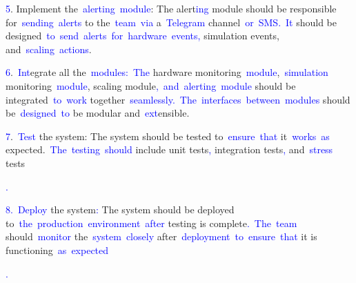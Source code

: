 \documentclass{article}
\begin{document}
\begin{tcolorbox}[colframe=black,colback=white]
\textcolor{blue}{5}. Implement the\textcolor{blue}{~alert}\textcolor{blue}{ing}\textcolor{blue}{~module}: The alert\textcolor{blue}{ing} module should be responsible for\textcolor{blue}{~sending}\textcolor{blue}{~alerts} to the\textcolor{blue}{~team}\textcolor{blue}{~via} a\textcolor{blue}{~Telegram} channel\textcolor{blue}{~or}\textcolor{blue}{~SMS}\textcolor{blue}{.}\textcolor{blue}{~It} should be designed\textcolor{blue}{~to}\textcolor{blue}{~send}\textcolor{blue}{~alerts}\textcolor{blue}{~for}\textcolor{blue}{~hardware}\textcolor{blue}{~events}\textcolor{blue}{,} simulation events, and\textcolor{blue}{~scaling}\textcolor{blue}{~actions}.

\textcolor{blue}{6}.\textcolor{blue}{~Int}egrate all the\textcolor{blue}{~modules}\textcolor{blue}{:}\textcolor{blue}{~The} hardware monitoring\textcolor{blue}{~module},\textcolor{blue}{~simulation} monitoring\textcolor{blue}{~module}, scaling module\textcolor{blue}{,}\textcolor{blue}{~and}\textcolor{blue}{~alert}\textcolor{blue}{ing}\textcolor{blue}{~module} should be integrated\textcolor{blue}{~to}\textcolor{blue}{~work} together\textcolor{blue}{~seamlessly}\textcolor{blue}{.}\textcolor{blue}{~The}\textcolor{blue}{~interfaces}\textcolor{blue}{~between}\textcolor{blue}{~modules} should be\textcolor{blue}{~designed}\textcolor{blue}{~to} be modular and\textcolor{blue}{~ext}ensible.

\textcolor{blue}{7}.\textcolor{blue}{~Test} the system: The system should be tested to\textcolor{blue}{~ensure}\textcolor{blue}{~that} it\textcolor{blue}{~works}\textcolor{blue}{~as} expected.\textcolor{blue}{~The}\textcolor{blue}{~testing}\textcolor{blue}{~should} include unit tests\textcolor{blue}{,} integration tests\textcolor{blue}{,} and\textcolor{blue}{~stress} tests\textcolor{blue}{.

}\textcolor{blue}{8}\textcolor{blue}{.}\textcolor{blue}{~Deploy} the system\textcolor{blue}{:} The system should be deployed to\textcolor{blue}{~the}\textcolor{blue}{~production}\textcolor{blue}{~environment}\textcolor{blue}{~after} testing is complete\textcolor{blue}{.}\textcolor{blue}{~The}\textcolor{blue}{~team} should\textcolor{blue}{~monitor} the\textcolor{blue}{~system}\textcolor{blue}{~closely} after\textcolor{blue}{~deployment}\textcolor{blue}{~to}\textcolor{blue}{~ensure}\textcolor{blue}{~that} it is functioning\textcolor{blue}{~as}\textcolor{blue}{~expected}\textcolor{blue}{.

}
\end{tcolorbox}
\end{document}
